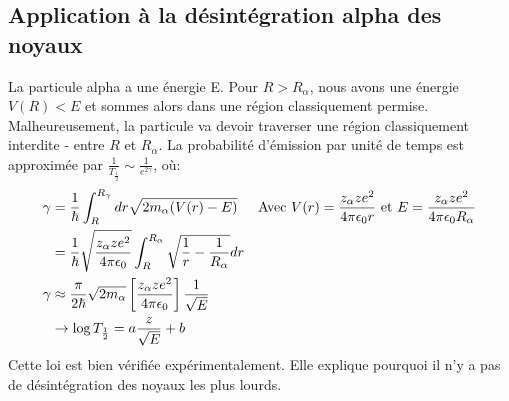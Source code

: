 \documentclass[../notesdecours]{subfiles}
\begin{document}
\subsection{Application à la désintégration alpha des noyaux}

La particule alpha a une énergie E. Pour $R>R_\alpha$, nous avons une énergie $V(R)<E$ et sommes alors dans une région classiquement permise. Malheureusement, la particule va devoir traverser une région classiquement interdite - entre $R$ et $R_\alpha$. La probabilité d'émission par unité de temps est approximée par $\frac{1}{T_{\frac{1}{2}}} \sim \frac{1}{e^{2\gamma}}$, où:
\begin{align}
\gamma &= \frac{1}{\hbar} \int_R^{R_\gamma} dr\sqrt{2m_\alpha (V(r)-E)}		&\text{Avec } V(r) = \frac{z_\alpha ze^2}{4\pi\epsilon_0r} \text{ et } E = \frac{z_\alpha ze^2}{4\pi\epsilon_0R_\alpha}\\
&= \frac{1}{\hbar} \sqrt{\frac{z_\alpha ze^2}{4\pi\epsilon_0}} \int_R^{R_\alpha} \sqrt{\frac{1}{r} - \frac{1}{R_\alpha}} dr\\
\gamma &\approx \frac{\pi}{2\hbar} \sqrt{2m_\alpha} \left[\frac{z_\alpha ze^2}{4\pi\epsilon_0}\right]\frac{1}{\sqrt{E}}\\
&\rightarrow \log T_{\frac{1}{2}} = a\frac{z}{\sqrt{E}} + b
\end{align}
Cette loi est bien vérifiée expérimentalement. Elle explique pourquoi il n'y a pas de désintégration des noyaux les plus lourds.
\end{document}
